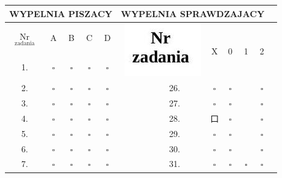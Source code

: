 \documentclass[10pt]{article}
\begin{document}
\begin{center}
\begin{tabular}{|c|c|c|c|c|c|c|c|c|c|c|c|c|}
\hline
\multicolumn{5}{|c|}{WYPELNIA PISZACY} & \multicolumn{7}{|r|}{WYPELNIA SPRAWDZAJACY} &  \\
\hline
\( \underset{\text { zadania }}{\mathrm{Nr}} \) & A & B & C & D & \multicolumn{2}{|r|}{\multirow[b]{2}{*}{\includegraphics[max width=\textwidth]{2024_11_21_0fa17f80dfe1c6bd3b66g-16}
}} & \multirow[b]{2}{*}{X} & \multirow[b]{2}{*}{0} & \multicolumn{2}{|c|}{\multirow[b]{2}{*}{1}} & \multirow[b]{2}{*}{2} &  \\
\hline
1. & \(\square\) & \(\square\) & \(\square\) & \(\square\) &  &  &  &  &  &  &  &  \\
\hline
2. & \(\square\) & \(\square\) & \(\square\) & \(\square\) &  & 26. & \(\square\) & \(\square\) &  &  & \(\square\) &  \\
\hline
3. & \(\square\) & \(\square\) & \(\square\) & \(\square\) &  & 27. & \(\square\) & \(\square\) &  &  & \(\square\) &  \\
\hline
4. & \(\square\) & \(\square\) & \(\square\) & \(\square\) &  & 28. & 口 & \(\square\) &  &  & \(\square\) &  \\
\hline
5. & \(\square\) & \(\square\) & \(\square\) & \(\square\) &  & 29. & \(\square\) & \(\square\) &  &  & \(\square\) &  \\
\hline
6. & \(\square\) & \(\square\) & \(\square\) & \(\square\) &  & 30. & \(\square\) & \(\square\) &  &  & \(\square\) &  \\
\hline
7. & \(\square\) & \(\square\) & \(\square\) & \(\square\) &  & \multirow[t]{2}{*}{31.} & \(\square\) & \(\square\) & \multicolumn{2}{|c|}{\multirow[t]{2}{*}{\(\square\)}} & \multirow[t]{2}{*}{\(\square\)} &  \\

\end{tabular}
\end{center}
\end{document}
